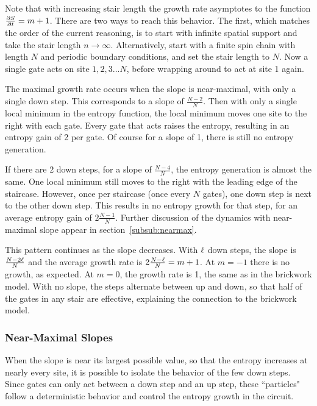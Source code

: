 Note that with increasing stair length the growth rate asymptotes to the function $\frac{\partial S}{\partial t} = m+1$. There are two ways to reach this behavior. The first, which matches the order of the current reasoning, is to start with infinite spatial support and take the stair length $n\to\infty$. Alternatively, start with a finite spin chain with length $N$ and periodic boundary conditions, and set the stair length to $N$. Now a single gate acts on site $1,2,3\dots N$, before wrapping around to act at site 1 again. 

The maximal growth rate occurs when the slope is near-maximal, with only a single down step. This corresponds to a slope of $\frac{N-2}{N}$. Then with only a single local minimum in the entropy function, the local minimum moves one site to the right with each gate. Every gate that acts raises the entropy, resulting in an entropy gain of 2 per gate. Of course for a slope of 1, there is still no entropy generation.

If there are 2 down steps, for a slope of $\frac{N-4}{N}$, the entropy generation is almost the same. One local minimum still moves to the right with the leading edge of the staircase. However, once per staircase (once every $N$ gates), one down step is next to the other down step. This results in no entropy growth for that step, for an average entropy gain of $2\frac{N-1}{N}$. Further discussion of the dynamics with near-maximal slope appear in section~\ref{subsub:nearmax}.

This pattern continues as the slope decreases. With $\ell$ down steps, the slope is $\frac{N-2\ell}{N}$ and the average growth rate is $2\frac{N-\ell}{N} = m+1$. At $m = -1$ there is no growth, as expected. At $m=0$, the growth rate is 1, the same as in the brickwork model. With no slope, the steps alternate between up and down, so that half of the gates in any stair are effective, explaining the connection to the brickwork model.

\subsubsection{Near-Maximal Slopes} \emph{} \label{subsub:nearmax}

When the slope is near its largest possible value, so that the entropy increases at nearly every site, it is possible to isolate the behavior of the few down steps. Since gates can only act between a down step and an up step, these ``particles" follow a deterministic behavior and control the entropy growth in the circuit.


